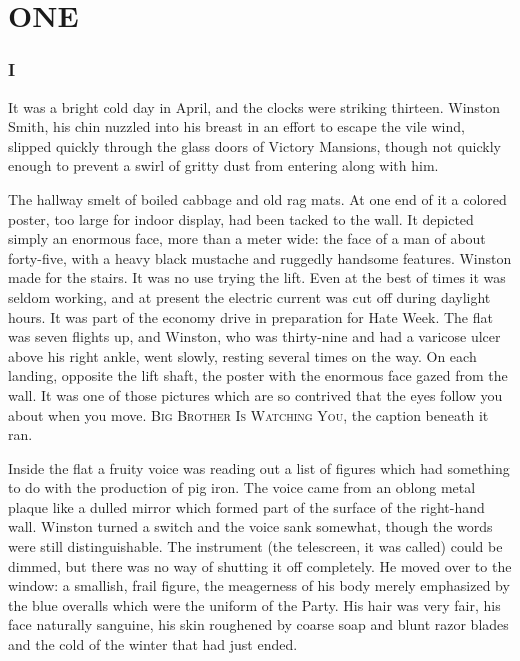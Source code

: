 \clearpage
\part{ONE}\label{one}

\section{I}

It was a bright cold day in April, and the clocks were striking
thirteen. Winston Smith, his chin nuzzled into his breast in an effort
to escape the vile wind, slipped quickly through the glass doors of
Victory Mansions, though not quickly enough to prevent a swirl of gritty
dust from entering along with him.

The hallway smelt of boiled cabbage and old rag mats. At one end of it a
colored poster, too large for indoor display, had been tacked to the wall.
It depicted simply an enormous face, more than a meter wide: the face of a
man of about forty-five, with a heavy black mustache and ruggedly handsome
features. Winston made for the stairs. It was no use trying the lift. Even
at the best of times it was seldom working, and at present the electric
current was cut off during daylight hours. It was part of the economy drive
in preparation for Hate Week. The flat was seven flights up, and Winston,
who was thirty-nine and had a varicose ulcer above his right ankle, went
slowly, resting several times on the way. On each landing, opposite the lift
shaft, the poster with the enormous face gazed from the wall. It was one of
those pictures which are so contrived that the eyes follow you about when
you move. \textsc{Big Brother Is Watching You}, the caption beneath it ran.

Inside the flat a fruity voice was reading out a list of figures which
had something to do with the production of pig iron. The voice came from
an oblong metal plaque like a dulled mirror which formed part of the
surface of the right-hand wall. Winston turned a switch and the voice
sank somewhat, though the words were still distinguishable. The
instrument (the telescreen, it was called) could be dimmed, but there
was no way of shutting it off completely. He moved over to the window: a
smallish, frail figure, the meagerness of his body merely emphasized by
the blue overalls which were the uniform of the Party. His hair was very
fair, his face naturally sanguine, his skin roughened by coarse soap and
blunt razor blades and the cold of the winter that had just ended.

